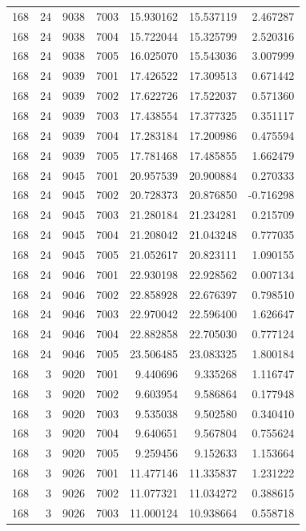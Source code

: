 \begin{table}
\begin{tabular}{rrrrrrr}
168 & 24 & 9038 & 7003 & 15.930162 & 15.537119 & 2.467287 \\
168 & 24 & 9038 & 7004 & 15.722044 & 15.325799 & 2.520316 \\
168 & 24 & 9038 & 7005 & 16.025070 & 15.543036 & 3.007999 \\
168 & 24 & 9039 & 7001 & 17.426522 & 17.309513 & 0.671442 \\
168 & 24 & 9039 & 7002 & 17.622726 & 17.522037 & 0.571360 \\
168 & 24 & 9039 & 7003 & 17.438554 & 17.377325 & 0.351117 \\
168 & 24 & 9039 & 7004 & 17.283184 & 17.200986 & 0.475594 \\
168 & 24 & 9039 & 7005 & 17.781468 & 17.485855 & 1.662479 \\
168 & 24 & 9045 & 7001 & 20.957539 & 20.900884 & 0.270333 \\
168 & 24 & 9045 & 7002 & 20.728373 & 20.876850 & -0.716298 \\
168 & 24 & 9045 & 7003 & 21.280184 & 21.234281 & 0.215709 \\
168 & 24 & 9045 & 7004 & 21.208042 & 21.043248 & 0.777035 \\
168 & 24 & 9045 & 7005 & 21.052617 & 20.823111 & 1.090155 \\
168 & 24 & 9046 & 7001 & 22.930198 & 22.928562 & 0.007134 \\
168 & 24 & 9046 & 7002 & 22.858928 & 22.676397 & 0.798510 \\
168 & 24 & 9046 & 7003 & 22.970042 & 22.596400 & 1.626647 \\
168 & 24 & 9046 & 7004 & 22.882858 & 22.705030 & 0.777124 \\
168 & 24 & 9046 & 7005 & 23.506485 & 23.083325 & 1.800184 \\
168 & 3 & 9020 & 7001 & 9.440696 & 9.335268 & 1.116747 \\
168 & 3 & 9020 & 7002 & 9.603954 & 9.586864 & 0.177948 \\
168 & 3 & 9020 & 7003 & 9.535038 & 9.502580 & 0.340410 \\
168 & 3 & 9020 & 7004 & 9.640651 & 9.567804 & 0.755624 \\
168 & 3 & 9020 & 7005 & 9.259456 & 9.152633 & 1.153664 \\
168 & 3 & 9026 & 7001 & 11.477146 & 11.335837 & 1.231222 \\
168 & 3 & 9026 & 7002 & 11.077321 & 11.034272 & 0.388615 \\
168 & 3 & 9026 & 7003 & 11.000124 & 10.938664 & 0.558718 \\

\end{tabular}
\end{table}
